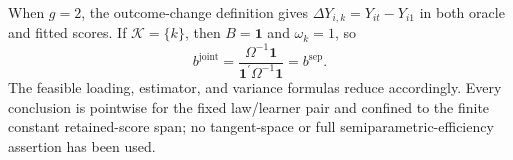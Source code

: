 When \(g=2\), the outcome-change definition gives \(\Delta Y_{i,k}=Y_{it}-Y_{i1}\) in both oracle and fitted scores. If \(\mathcal K=\{k\}\), then \(B=\mathbf 1\) and \(\omega_k=1\), so
\[
b^{\mathrm{joint}}
=\frac{\Omega^{-1}\mathbf 1}{\mathbf 1^{\prime}\Omega^{-1}\mathbf 1}
=b^{\mathrm{sep}}.
\]
The feasible loading, estimator, and variance formulas reduce accordingly. Every conclusion is pointwise for the fixed law/learner pair and confined to the finite constant retained-score span; no tangent-space or full semiparametric-efficiency assertion has been used.